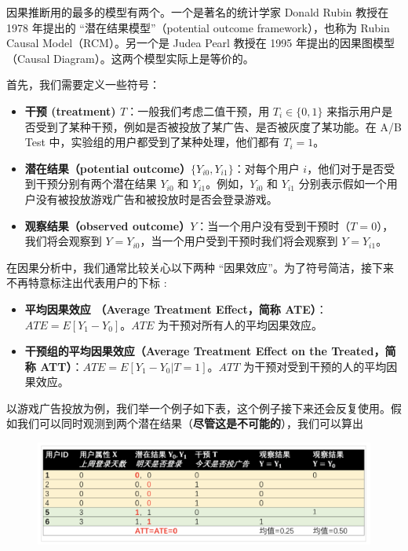 \documentclass[12pt]{article}
\begin{document}
因果推断用的最多的模型有两个。一个是著名的统计学家 Donald Rubin 教授在 1978 年提出的 “潜在结果模型”（potential outcome framework），也称为 Rubin Causal Model（RCM）。另一个是 Judea Pearl 教授在 1995 年提出的因果图模型（Causal Diagram）。这两个模型实际上是等价的。

首先，我们需要定义一些符号：
\begin{itemize}
\setlength{\itemsep}{0pt}
\setlength{\parsep}{0pt}
\setlength{\parskip}{0pt}
    \item \textbf{干预 (treatment) $T$}：一般我们考虑二值干预，用 $T_i \in \{0,1\}$ 来指示用户是否受到了某种干预，例如是否被投放了某广告、是否被灰度了某功能。在 A/B Test 中，实验组的用户都受到了某种处理，他们都有 $T_i=1$。

    \item \textbf{潜在结果（potential outcome）$\{Y_{i0}, Y_{i1}\}$}：对每个用户 $i$，他们对于是否受到干预分别有两个潜在结果 $Y_{i0}$ 和 $Y_{i1}$。例如，$Y_{i0}$ 和 $Y_{i1}$ 分别表示假如一个用户没有被投放游戏广告和被投放时是否会登录游戏。
    
    \item \textbf{观察结果（observed outcome）$Y$}：当一个用户没有受到干预时（$T=0$），我们将会观察到 $Y=Y_{i0}$，当一个用户受到干预时我们将会观察到 $Y=Y_{i1}$。
\end{itemize}

在因果分析中，我们通常比较关心以下两种 “因果效应”。为了符号简洁，接下来不再特意标注出代表用户的下标 :
\begin{itemize}
\setlength{\itemsep}{0pt}
\setlength{\parsep}{0pt}
\setlength{\parskip}{0pt}
    \item \textbf{平均因果效应 （Average Treatment Effect，简称 ATE）}： $ATE=E[Y_1 - Y_0]$。$ATE$ 为干预对所有人的平均因果效应。

    \item \textbf{干预组的平均因果效应（Average Treatment Effect on the Treated，简称 ATT）}：$ATE=E[Y_1 - Y_0|T = 1]$。$ATT$ 为干预对受到干预的人的平均因果效应。
\end{itemize}

以游戏广告投放为例，我们举一个例子如下表，这个例子接下来还会反复使用。假如我们可以同时观测到两个潜在结果（\textbf{尽管这是不可能的}），我们可以算出 
\begin{figure}[H]
    \centering
    \includegraphics[width=1\textwidth]{fig/CasualInference-Game-Ad-1.png}
\end{figure}
\end{document}
